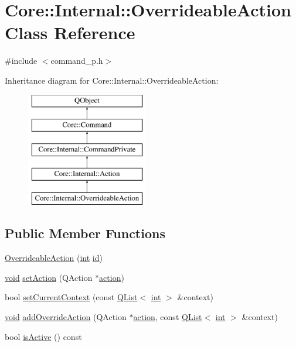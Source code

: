 \hypertarget{class_core_1_1_internal_1_1_overrideable_action}{\section{Core\-:\-:Internal\-:\-:Overrideable\-Action Class Reference}
\label{class_core_1_1_internal_1_1_overrideable_action}
}


{\ttfamily \#include $<$command\-\_\-p.\-h$>$}

Inheritance diagram for Core\-:\-:Internal\-:\-:Overrideable\-Action\-:\begin{figure}[H]
\begin{center}
\leavevmode
\includegraphics[height=5.000000cm]{class_core_1_1_internal_1_1_overrideable_action}
\end{center}
\end{figure}
\subsection*{Public Member Functions}
\begin{DoxyCompactItemize}
\item 
\hyperlink{group___core_plugin_ga6f14414c6a5bec07b396e4563d738efb}{Overrideable\-Action} (\hyperlink{ioapi_8h_a787fa3cf048117ba7123753c1e74fcd6}{int} \hyperlink{glext_8h_a58c2a664503e14ffb8f21012aabff3e9}{id})
\item 
\hyperlink{group___u_a_v_objects_plugin_ga444cf2ff3f0ecbe028adce838d373f5c}{void} \hyperlink{group___core_plugin_ga243ee26e1559a0d60e0901f31b240d84}{set\-Action} (Q\-Action $\ast$\hyperlink{group___core_plugin_gaad3b2792dc4533f93c529fe55dcc26e8}{action})
\item 
bool \hyperlink{group___core_plugin_gab0f7a22e946de82d6a21ccc4dcd4c57e}{set\-Current\-Context} (const \hyperlink{class_q_list}{Q\-List}$<$ \hyperlink{ioapi_8h_a787fa3cf048117ba7123753c1e74fcd6}{int} $>$ \&context)
\item 
\hyperlink{group___u_a_v_objects_plugin_ga444cf2ff3f0ecbe028adce838d373f5c}{void} \hyperlink{group___core_plugin_ga8b41e27764024e075b44525fee184192}{add\-Override\-Action} (Q\-Action $\ast$\hyperlink{group___core_plugin_gaad3b2792dc4533f93c529fe55dcc26e8}{action}, const \hyperlink{class_q_list}{Q\-List}$<$ \hyperlink{ioapi_8h_a787fa3cf048117ba7123753c1e74fcd6}{int} $>$ \&context)
\item 
bool \hyperlink{group___core_plugin_gabfac13c8e9d1bb23e86a8f9d11c140e8}{is\-Active} () const 
\end{DoxyCompactItemize}

